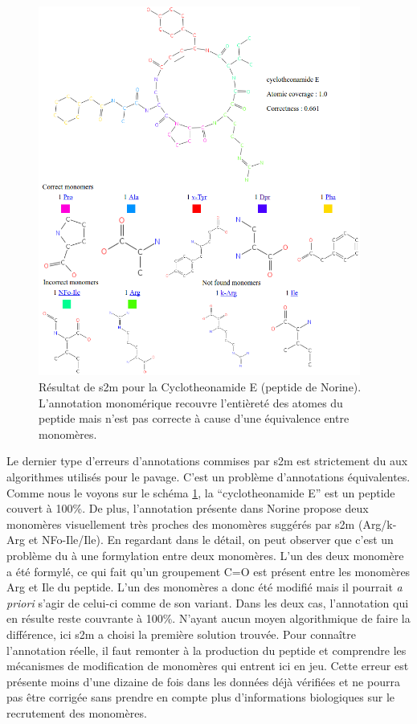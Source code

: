 \begin{figure}[h!]
  \begin{center}
    \includegraphics[width=400px]{Figures/s2m/results/cyclotheonamide.png}
    \caption{\label{cycloth}Résultat de s2m pour la Cyclotheonamide E (peptide de Norine).
    L'annotation monomérique recouvre l'entièreté des atomes du peptide mais n'est pas correcte à cause d'une équivalence entre monomères.}
  \end{center}
\end{figure}

Le dernier type d'erreurs d'annotations commises par s2m est strictement du aux algorithmes utilisés pour le pavage.
C'est un problème d'annotations équivalentes.
Comme nous le voyons sur le schéma \ref{cycloth}, la ``cyclotheonamide E'' est un peptide couvert à 100\%.
De plus, l'annotation présente dans Norine propose deux monomères visuellement très proches des monomères suggérés par s2m (Arg/k-Arg et NFo-Ile/Ile).
En regardant dans le détail, on peut observer que c'est un problème du à une formylation entre deux monomères.
L'un des deux monomère a été formylé, ce qui fait qu'un groupement C=O est présent entre les monomères Arg et Ile du peptide.
L'un des monomères a donc été modifié mais il pourrait \textit{a priori} s'agir de celui-ci comme de son variant.
Dans les deux cas, l'annotation qui en résulte reste couvrante à 100\%.
N'ayant aucun moyen algorithmique de faire la différence, ici s2m a choisi la première solution trouvée.
Pour connaître l'annotation réelle, il faut remonter à la production du peptide et comprendre les mécanismes de modification de monomères qui entrent ici en jeu.
Cette erreur est présente moins d'une dizaine de fois dans les données déjà vérifiées et ne pourra pas être corrigée sans prendre en compte plus d'informations biologiques sur le recrutement des monomères.



